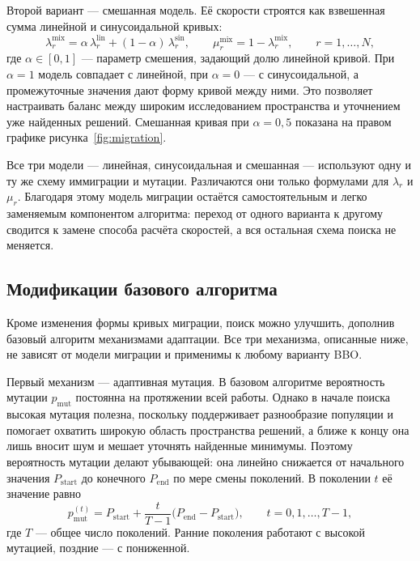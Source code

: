 \documentclass[14pt, a4paper]{extarticle}
\begin{document}
Второй вариант --- смешанная модель. Её скорости строятся как взвешенная сумма
линейной и синусоидальной кривых:
\begin{equation}\label{eq:mix-rates}
  \lambda_r^{\text{mix}} =
    \alpha\, \lambda_r^{\text{lin}} + (1 - \alpha)\, \lambda_r^{\text{sin}},
  \qquad
  \mu_r^{\text{mix}} = 1 - \lambda_r^{\text{mix}},
  \qquad r = 1, \dots, N,
\end{equation}
где $\alpha \in [0, 1]$ --- параметр смешения, задающий долю линейной кривой. При
$\alpha = 1$ модель совпадает с линейной, при $\alpha = 0$ --- с синусоидальной,
а промежуточные значения дают форму кривой между ними. Это позволяет настраивать
баланс между широким исследованием пространства и уточнением уже найденных
решений. Смешанная кривая при $\alpha = 0{,}5$ показана на правом графике
рисунка~\ref{fig:migration}.

Все три модели --- линейная, синусоидальная и смешанная --- используют одну и ту
же схему иммиграции и мутации. Различаются они только формулами для $\lambda_r$
и $\mu_r$. Благодаря этому модель миграции остаётся самостоятельным и легко
заменяемым компонентом алгоритма: переход от одного варианта к другому сводится
к замене способа расчёта скоростей, а вся остальная схема поиска не меняется.

\subsection{Модификации базового алгоритма}
\label{subsec:bbo-mods}

Кроме изменения формы кривых миграции, поиск можно улучшить, дополнив базовый
алгоритм механизмами адаптации. Все три механизма, описанные ниже, не зависят от
модели миграции и применимы к любому варианту BBO.

Первый механизм --- адаптивная мутация. В базовом алгоритме вероятность мутации
$p_{\text{mut}}$ постоянна на протяжении всей работы. Однако в начале поиска
высокая мутация полезна, поскольку поддерживает разнообразие популяции и помогает
охватить широкую область пространства решений, а ближе к концу она лишь вносит
шум и мешает уточнять найденные минимумы. Поэтому вероятность мутации делают
убывающей: она линейно снижается от начального значения $P_{\text{start}}$ до
конечного $P_{\text{end}}$ по мере смены поколений. В поколении $t$ её значение
равно
\begin{equation}\label{eq:adaptive-mut}
  p_{\text{mut}}^{(t)} = P_{\text{start}} +
  \frac{t}{T - 1}\bigl(P_{\text{end}} - P_{\text{start}}\bigr),
  \qquad t = 0, 1, \dots, T-1,
\end{equation}
где $T$ --- общее число поколений. Ранние поколения работают с высокой мутацией,
поздние --- с пониженной.
\end{document}
